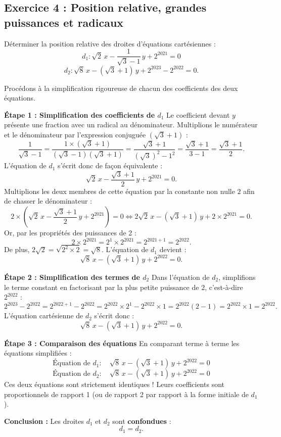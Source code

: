 \documentclass[11pt,a4paper]{article}
\begin{document}
\subsection*{Exercice 4 : Position relative, grandes puissances et radicaux}

\begin{enoncebox}
Déterminer la position relative des droites d'équations cartésiennes :
\[
d_1 : \sqrt{2}\,x - \frac{1}{\sqrt{3}-1}\,y + 2^{2021} = 0
\]
\[
d_2 : \sqrt{8}\,x - (\sqrt{3}+1)\,y + 2^{2023} - 2^{2022} = 0.
\]
\end{enoncebox}

\begin{correctionbox}
Procédons à la simplification rigoureuse de chacun des coefficients des deux équations.

\textbf{Étape 1 : Simplification des coefficients de $d_1$}
Le coefficient devant $y$ présente une fraction avec un radical au dénominateur. Multiplions le numérateur et le dénominateur par l'expression conjuguée $(\sqrt{3} + 1)$ :
\[
\frac{1}{\sqrt{3} - 1} = \frac{1 \times (\sqrt{3} + 1)}{(\sqrt{3} - 1)(\sqrt{3} + 1)} = \frac{\sqrt{3} + 1}{(\sqrt{3})^2 - 1^2} = \frac{\sqrt{3} + 1}{3 - 1} = \frac{\sqrt{3} + 1}{2}.
\]
L'équation de $d_1$ s'écrit donc de façon équivalente :
\[
\sqrt{2}\,x - \frac{\sqrt{3} + 1}{2}\,y + 2^{2021} = 0.
\]
Multiplions les deux membres de cette équation par la constante non nulle $2$ afin de chasser le dénominateur :
\[
2 \times \left(\sqrt{2}\,x - \frac{\sqrt{3} + 1}{2}\,y + 2^{2021}\right) = 0 \iff 2\sqrt{2}\,x - (\sqrt{3} + 1)\,y + 2 \times 2^{2021} = 0.
\]
Or, par les propriétés des puissances de 2 :
\[
2 \times 2^{2021} = 2^1 \times 2^{2021} = 2^{2021 + 1} = 2^{2022}.
\]
De plus, $2\sqrt{2} = \sqrt{2^2 \times 2} = \sqrt{8}$. L'équation de $d_1$ devient :
\[
\sqrt{8}\,x - (\sqrt{3} + 1)\,y + 2^{2022} = 0.
\]

\textbf{Étape 2 : Simplification des termes de $d_2$}
Dans l'équation de $d_2$, simplifions le terme constant en factorisant par la plus petite puissance de $2$, c'est-à-dire $2^{2022}$ :
\[
2^{2023} - 2^{2022} = 2^{2022 + 1} - 2^{2022} = 2^{2022} \times 2^1 - 2^{2022} \times 1 = 2^{2022}(2 - 1) = 2^{2022} \times 1 = 2^{2022}.
\]
L'équation cartésienne de $d_2$ s'écrit donc :
\[
\sqrt{8}\,x - (\sqrt{3} + 1)\,y + 2^{2022} = 0.
\]

\textbf{Étape 3 : Comparaison des équations}
En comparant terme à terme les équations simplifiées :
\[
\text{Équation de } d_1 : \quad \sqrt{8}\,x - (\sqrt{3} + 1)\,y + 2^{2022} = 0
\]
\[
\text{Équation de } d_2 : \quad \sqrt{8}\,x - (\sqrt{3} + 1)\,y + 2^{2022} = 0
\]
Ces deux équations sont strictement identiques ! Leurs coefficients sont proportionnels de rapport 1 (ou de rapport 2 par rapport à la forme initiale de $d_1$).

\textbf{Conclusion :} Les droites $d_1$ et $d_2$ sont \textbf{confondues} :
\[
d_1 = d_2.
\]
\end{correctionbox}
\end{document}
